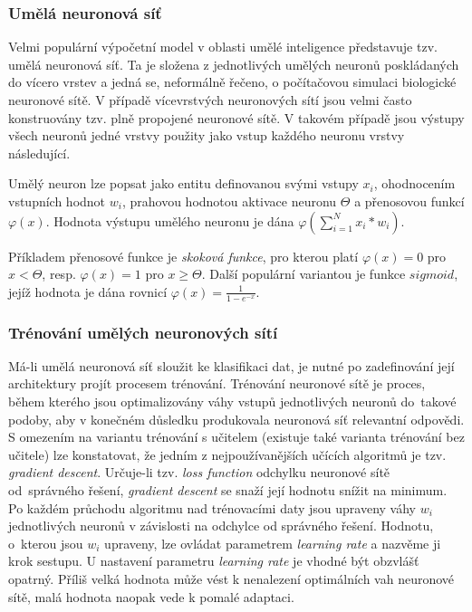 \documentclass[
  field=ainfp,
  master=true,
  biblatex,
  sourcecodes=false,
  theorems=false,
  glossaries,
  index
]{kidiplom}
\begin{document}
\subsubsection*{Umělá neuronová síť}
Velmi populární výpočetní model v oblasti umělé inteligence představuje tzv. umělá neuronová síť. Ta je složena z jednotlivých umělých neuronů poskládaných do vícero vrstev a jedná se, neformálně řečeno, o počítačovou simulaci biolo\-gické neuronové sítě. V případě vícevrstvých neuronových sítí jsou velmi často konstruovány tzv. plně propojené neuronové sítě. V takovém případě jsou vý\-stupy všech neuronů jedné vrstvy použity jako vstup každého neuronu vrstvy následující.

Umělý neuron lze popsat jako entitu definovanou svými vstupy $x_i$, ohodnocením vstupních hodnot $w_i$, prahovou hodnotou aktivace neuronu $\Theta$ a přenosovou funkcí $\varphi(x)$. Hodnota výstupu umělého neuronu je dána $\varphi(\sum_{i=1}^{N}x_i * w_i)$. 

Příkladem přenosové funkce je \textit{skoková funkce}, pro kterou platí $\varphi(x) = 0$ pro $x < \Theta$, resp. $\varphi(x) = 1$ pro $x \geq \Theta$. Další populární variantou je funkce $sigmoid$, jejíž hodnota je dána rovnicí $\varphi(x) = \frac{1}{1-e^{-x}}$.

\subsubsection*{Trénování umělých neuronových sítí}
Má-li umělá neuronová síť sloužit ke klasifikaci dat, je nutné po zadefinování její architektury projít procesem trénování. Trénování neuronové sítě je proces, během kterého jsou optimalizovány váhy vstupů jednotlivých neuronů do~takové podoby, aby v konečném důsledku produkovala neuronová síť relevantní odpovědi. S omezením na variantu trénování s učitelem (existuje také varianta trénování bez učitele) lze konstatovat, že jedním z nejpoužívanějších učících algoritmů je tzv. \textit{gradient descent}. Určuje-li tzv. \textit{loss function} odchylku neuronové sítě od~správného řešení, \textit{gradient descent} se snaží její hodnotu snížit na minimum. Po každém průchodu algoritmu nad trénovacími daty jsou upraveny váhy $w_i$ jednotlivých neuronů v závislosti na odchylce od správného řešení. Hodnotu, o~kterou jsou $w_i$ upraveny, lze ovládat parametrem \textit{learning rate} a nazvěme ji krok sestupu. U nastavení parametru \textit{learning rate} je vhodné být obzvlášť opatrný. Příliš velká hodnota může vést k nenalezení optimálních vah neuronové sítě, malá hodnota naopak vede k pomalé adaptaci. 
\end{document}
